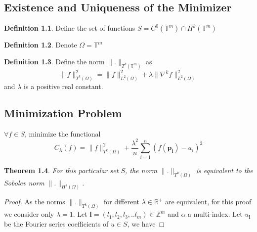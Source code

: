 \documentclass[multixcb]{amstext-l}
\theoremstyle{plain}
\newtheorem{theorem}{Theorem}[chapter]
\theoremstyle{definition}
\theoremstyle{definition}
\newtheorem{definition}[theorem]{Definition}
\theoremstyle{remark}
\numberwithin{equation}{chapter}
\begin{document}



\begin{appendix}

\chapter{Existence and Uniqueness of the Minimizer}\label{unique_minimizer}



\begin{definition}
Define the set of functions $S = C^0(\mathbb{T}^m)\cap H^k(\mathbb{T}^m)$
\end{definition}
\begin{definition}
Denote $\Omega = \mathbb{T}^m$
\end{definition}

\begin{definition}
Define the norm $\|.\|_{T^k(\mathbb{T}^m)}$ as
\begin{equation}
\label{tkdef}
 \|f\|_{T^k(\Omega)}^2 =     \|f\|_{L^2(\Omega)}^2 + \lambda \|\nabla^k f\|_{L^2(\Omega)}^2   
\end{equation}
 and $\lambda$ is a positive real constant.
\end{definition}

\section{Minimization Problem}
$\forall f \in S$, minimize the functional
\begin{equation}
\label{eq_edit_3}
C_{\lambda}(f) = \|f\|_{T^k(\Omega)}^2 + \frac{\lambda^2}{n}\sum\limits_{i = 1}^n(f(\boldsymbol{p_i})-a_i)^2
\end{equation}%



\begin{theorem}
\label{th_eq}
For this particular set $S$, the norm $\|.\|_{T^k(\Omega)}$ is equivalent to the Sobolev norm $\|.\|_{H^k(\Omega)}$.
\end{theorem}

\begin{proof}
As the norms $\|.\|_{T^k(\Omega)}$ for different $\lambda \in \mathbb{R}^+$ are equivalent, for this proof we consider only $\lambda = 1$.
Let $\boldsymbol{l} = (l_1,l_2,l_3,..l_m)\in \mathbb{Z}^m$ and $\alpha$ a multi-index. Let $u_{\boldsymbol{l}}$ be the Fourier series coefficients of $u\in S$, we have


\end{proof}
\end{appendix}
\end{document}

